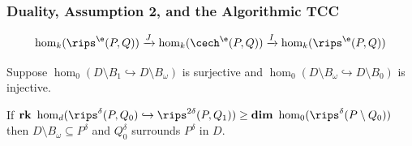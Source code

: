 \begin{frame}
  \frametitle{{\small Duality, Assumption 2, and the Algorithmic TCC}}

  \begin{small}
    \[ \hom_k(\rips^\e(P, Q))\xrightarrow{J}\hom_k(\cech^\e(P, Q))\xrightarrow{I}\hom_k(\rips^\e(P, Q))\]


    \begin{theorem}\label{thm:algo_tcc}
      Suppose $\hom_0(D\setminus B_{1}\hookrightarrow D\setminus B_\omega)$ is surjective and $\hom_0(D\setminus B_\omega\hookrightarrow D\setminus B_{0})$ is injective.

       If $\mathbf{rk}~\hom_d(\rips^\delta(P, Q_{0})\hookrightarrow \rips^{2\delta}(P, Q_{1})) \geq \mathbf{dim}~\hom_0(\rips^\delta(P\setminus Q_{0}))$ then $D\setminus B_\omega\subseteq P^\delta$ and $Q_{0}^\delta$ surrounds $P^\delta$ in $D$.
    \end{theorem}
  \end{small}

\end{frame}
